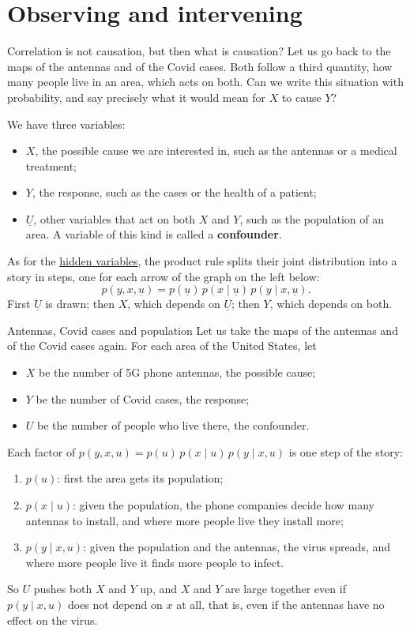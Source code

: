 \documentclass[a4paper,12pt,oneside]{report}
\begin{document}
\section{Observing and intervening}\label{sec:causation}

Correlation is not causation, but then what is causation? Let us go back
to the maps of the antennas and of the Covid cases. Both follow a third
quantity, how many people live in an area, which acts on both. Can we
write this situation with probability, and say precisely what it would
mean for $X$ to cause $Y$?

We have three variables:
\begin{itemize}
\item $X$, the possible cause we are interested in, such as the antennas
or a medical treatment;
\item $Y$, the response, such as the cases or the health of a patient;
\item $\underline{U}$, other variables that act on both $X$ and $Y$, such
as the population of an area. A variable of this kind is called a
\textbf{confounder}.
\end{itemize}
As for the \hyperref[marginal]{hidden variables}, the product rule splits
their joint distribution into a story in steps, one for each arrow of the
graph on the left below:
\[
p(y,x,\underline{u})=p(\underline{u})\,p(x\mid\underline{u})\,p(y\mid x,\underline{u}).
\]
First $\underline{U}$ is drawn; then $X$, which depends on $\underline{U}$;
then $Y$, which depends on both.

\begin{framedexample}{Antennas, Covid cases and population}\label{ex:covid-5g}
Let us take the maps of the antennas and of the Covid cases again. For
each area of the United States, let
\begin{itemize}
\item $X$ be the number of 5G phone antennas, the possible cause;
\item $Y$ be the number of Covid cases, the response;
\item $U$ be the number of people who live there, the confounder.
\end{itemize}
Each factor of $p(y,x,u)=p(u)\,p(x\mid u)\,p(y\mid x,u)$ is one step of
the story:
\begin{enumerate}
\item $p(u)$: first the area gets its population;
\item $p(x\mid u)$: given the population, the phone companies decide how
many antennas to install, and where more people live they install more;
\item $p(y\mid x,u)$: given the population and the antennas, the virus
spreads, and where more people live it finds more people to infect.
\end{enumerate}
So $U$ pushes both $X$ and $Y$ up, and $X$ and $Y$ are large together even
if $p(y\mid x,u)$ does not depend on $x$ at all, that is, even if the
antennas have no effect on the virus.
\end{framedexample}
\end{document}
